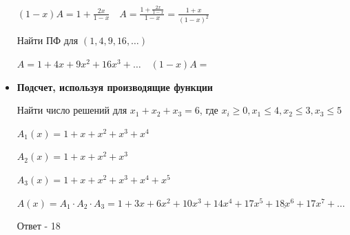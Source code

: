 \documentclass[12pt]{article}
\begin{document}
\begin{itemize}
        $(1 - x)A = 1 + \frac{2x}{1 - x} \quad A = \frac{1 + \frac{2x}{1 - x}}{1 - x} = \frac{1 + x}{(1 - x)^2}$

        \Ex Найти ПФ для $(1, 4, 9, 16, \dots)$

        $A = 1 + 4x + 9x^2 + 16x^3 + \dots \quad (1 - x)A = $

        \item \textbf{Подсчет, используя производящие функции}

        Найти число решений для $x_1 + x_2 + x_3 = 6$, где $x_i \geq 0, x_1 \leq 4, x_2 \leq 3, x_3 \leq 5$

        $A_1(x) = 1 + x + x^2 + x^3 + x^4$

        $A_2(x) = 1 + x + x^2 + x^3$

        $A_3(x) = 1 + x + x^2 + x^3 + x^4 + x^5$

        $A(x) = A_1 \cdot A_2 \cdot A_3 = 1 + 3x + 6x^2 + 10x^3 + 14x^4 + 17x^5 + \underline{18x^6} + 17x^7 + \dots$

        Ответ - 18

    \end{itemize}

\end{document}
